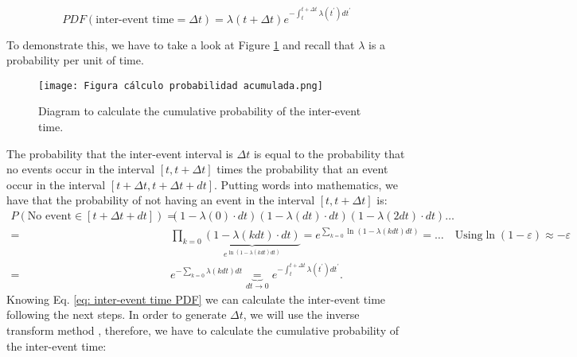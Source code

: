 \begin{equation}
    PDF(\text{inter-event time}=\Delta t) = \lambda(t+\Delta t) e^{-\int_t^{t+\Delta t}\lambda(t^\prime)dt^\prime} 
    \label{eq: inter-event time PDF}
\end{equation}

To demonstrate this, we have to take a look at Figure \ref{f: Figura calculo probabilidad acumulada} and recall that $\lambda$ is a probability per unit of time.

\begin{figure}[H]
    \centering
    \texttt{[image: Figura cálculo probabilidad acumulada.png]}
    \caption{Diagram to calculate the cumulative probability of the inter-event time.}
    \label{f: Figura calculo probabilidad acumulada}
\end{figure}
The probability that the inter-event interval is $\Delta t$ is equal to the probability that no events occur in the interval $[t,t+\Delta t]$  times the probability that an event occur in the 
interval $[t+\Delta t,t+\Delta t+ dt]$. Putting words into mathematics, we have that the probability of not having an event in the interval $[t,t+\Delta t]$ is:
\begin{equation}
    \begin{split}
        P(\text{No event}\in [t+\Delta t+dt])=& \left(1-\lambda(0)\cdot dt \right)\left(1-\lambda(dt)\cdot dt \right)\left(1-\lambda(2dt)\cdot dt \right)\ldots\\
        =& \prod_{k=0}\underbrace{\left(1 -\lambda(k dt)\cdot dt \right)}_{e^{\ln \left(1-\lambda(k dt)dt \right)}}=e^{\sum_{k=0}\ln \left(1-\lambda(k dt) dt \right)}= \ldots\quad \text{Using}  \ln(1-\varepsilon)\approx -\varepsilon\\
        =& e^{-\sum_{k=0}\lambda(kdt)dt}\underbrace{=}_{dt\to 0}e^{-\int_{t}^{t+\Delta t}\lambda(t^\prime)dt^\prime}.
    \end{split}
    \label{eq: probability of no events}
\end{equation} 
Knowing Eq. \ref{eq: inter-event time PDF} we can calculate the inter-event time following the next steps. 
In order to generate $\Delta t$, we will use the inverse transform method \cite{Toral}, therefore, we have to calculate the cumulative probability of the inter-event time:
